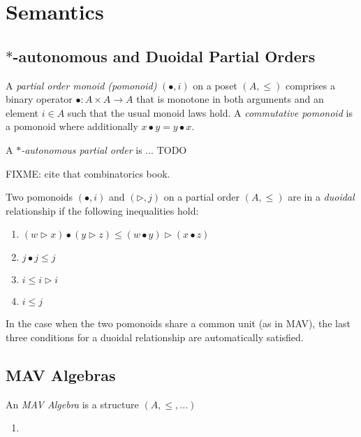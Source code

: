 \section{Semantics}\label{sec:mav-semantics}

\subsection{$*$-autonomous and Duoidal Partial Orders}

\begin{definition}
  A \emph{partial order monoid (pomonoid)} $(\bullet, i)$ on a poset
  $(A, \leq)$ comprises a binary operator $\bullet : A \times A \to A$
  that is monotone in both arguments and an element $i \in A$ such
  that the usual monoid laws hold. A \emph{commutative pomonoid} is a
  pomonoid where additionally $x \bullet y = y \bullet x$.
\end{definition}

\begin{definition}
  A \emph{$*$-autonomous partial order} is ... TODO
\end{definition}

FIXME: cite that combinatorics book.
\begin{definition}
  Two pomonoids $(\bullet, i)$ and $(\rhd, j)$ on a partial order
  $(A, \leq)$ are in a \emph{duoidal} relationship if the following
  inequalities hold:
  \begin{enumerate}
  \item $(w \rhd x) \bullet (y \rhd z) \leq (w \bullet y) \rhd (x \bullet z)$
  \item $j \bullet j \leq j$
  \item $i \leq i \rhd i$
  \item $i \leq j$
  \end{enumerate}
\end{definition}

\begin{remark}
  In the case when the two pomonoids share a common unit (as in MAV),
  the last three conditions for a duoidal relationship are
  automatically satisfied.
\end{remark}

\subsection{MAV Algebras}

\begin{definition}
  An \emph{MAV Algebra} is a structure $(A, \leq, ...)$
  \begin{enumerate}
  \item 
  \end{enumerate}
\end{definition}

